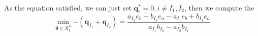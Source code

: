 \documentclass[twoside]{article}
\theoremstyle{plain}
\renewcommand{\vec}[1]{\bm{#1}}
\begin{document}
As the equation satisfied, we can just set $\vec{q}_i^{*} = 0, i \neq I_1,I_2$, then we compute the  
 \begin{equation}
 \min_{\vec{\theta} \in \mathcal{R}^{S}_{I}}{- ( \vec{q}_{I_1} +\vec{q}_{I_2} )} = \frac{a_{I_2}e_b - b_{I_2}e_a -a_{I_1}e_b +b_{I_1}e_a}{a_{I_1}b_{I_2}-a_{I_2}b_{I_1}}
\end{equation}
\end{document}
